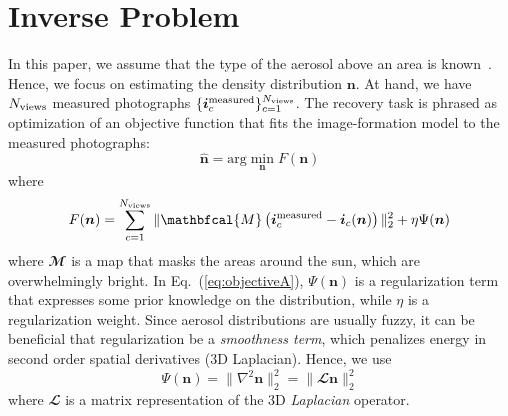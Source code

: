 \documentclass[10pt,letterpaper]{article}
\newcommand{\Mask}{\mathbfcal{M}}
\newcommand{\Laplacian}{\mathbfcal{L}}
\newcommand{\argmin}{\mathrm{arg}\min}
\newcommand{\roundy}[1]{\left(#1\right)}
\newcommand{\vect}[1]{\bm{#1}}
\begin{document}

\section{Inverse Problem}
\label{sec:inverse-problem}

In this paper, we assume that the type of the aerosol above an area is
known~\cite{Martonchik2009}. Hence, we focus on estimating the density
distribution ${\bm n}$.
At hand, we have $N_{\rm views}$ measured photographs $\{ {\bm i}^{\rm
  measured}_c\}_{c=1}^{N_{\rm views}}$. The recovery task is phrased
as optimization of an objective function that fits the image-formation
model to the measured photographs:
\begin{equation}
  \label{eq:minobjectiveA}
  \hat{\bm n} =
  \argmin_{{\bm n}} F({\bm n})
\end{equation}
where
\begin{equation}
  \label{eq:objectiveA}
  F({\bm n})
  = \sum_{c=1}^{N_{\rm views}}
  \| \Mask \roundy{{\bm i}^{\rm measured}_c - {\bm i}_c({\bm n})}\|^2_2
  + \eta \Psi({\bm n})
\end{equation}
where $\Mask$ is a map that masks the areas around the sun, which are
overwhelmingly bright. %
In Eq.~(\ref{eq:objectiveA}), $\Psi({\bm n})$ is a regularization term
that expresses some prior knowledge on the distribution, while $\eta$
is a regularization weight.  Since aerosol distributions are usually
fuzzy, it can be beneficial that regularization be a {\em smoothness
  term}, which penalizes energy in second order spatial derivatives
(3D Laplacian). Hence, we use
\begin{equation}
  \label{eq:regularizer}
  \Psi({\bm n}) = \| \nabla^2{\bm n}\|^2_2 = \| \Laplacian{\bm n}\|^2_2
\end{equation}
where $\Laplacian$ is a matrix representation of the 3D
\emph{Laplacian} operator.
\end{document}
